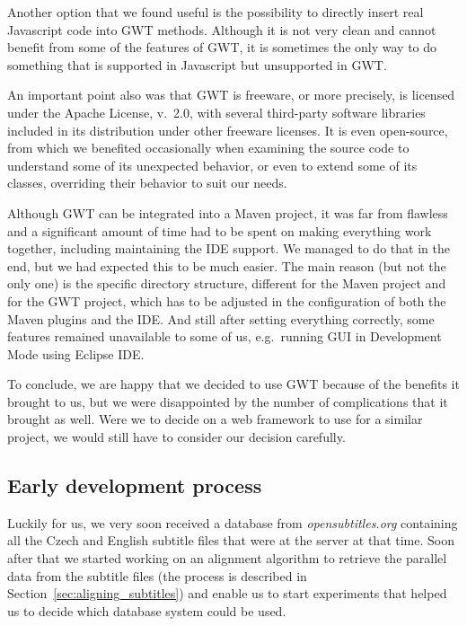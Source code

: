 Another option that we found useful is the possibility to directly insert real Javascript code into GWT methods. Although it is not very clean and cannot benefit from some of the features of GWT, it is sometimes the only way to do something that is supported in Javascript but unsupported in GWT.

An important point also was that GWT is freeware, or more precisely, is licensed under the Apache License, v.~2.0, with several third-party software libraries included in its distribution under other freeware licenses. It is even open-source, from which we benefited occasionally when examining the source code to understand some of its unexpected behavior, or even to extend some of its classes, overriding their behavior to suit our needs.

Although GWT can be integrated into a Maven project, it was far from flawless and a significant amount of time had to be spent on making everything work together, including maintaining the IDE support. We managed to do that in the end, but we had expected this to be much easier. 
The main reason (but not the only one) is the specific directory structure, different for the Maven project and for the GWT project, which has to be adjusted in the configuration of both the Maven plugins and the IDE.
And still after setting everything correctly, some features remained unavailable to some of us, e.g.\ running GUI in Development Mode using Eclipse IDE.

To conclude, we are happy that we decided to use GWT because of the benefits it brought to us, but we were disappointed by the number of complications that it brought as well. Were we to decide on a web framework to use for a similar project, we would still have to consider our decision carefully.

\subsection{Early development process}

Luckily for us, we very soon received a database from {\it opensubtitles.org} containing all the Czech and English subtitle files that were at the server at that time. Soon after that we started working on an alignment algorithm to retrieve the parallel data from the subtitle files (the process is described in Section~\ref{sec:aligning_subtitles}) and enable us to start experiments that helped us to decide which database system could be used.

